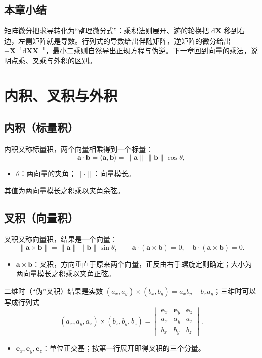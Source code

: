 \documentclass[a4paper]{article}
\begin{document}
\subsection{本章小结}

矩阵微分把求导转化为“整理微分式”：乘积法则展开、迹的轮换把 $\mathrm d\boldsymbol X$ 移到右边，左侧矩阵就是导数。行列式的导数给出伴随矩阵，逆矩阵的微分给出 $-\boldsymbol X^{-1}\mathrm d\boldsymbol X\boldsymbol X^{-1}$，最小二乘则自然导出正规方程与伪逆。下一章回到向量的乘法，说明点乘、叉乘与外积的区别。

\section{内积、叉积与外积}

\subsection{内积（标量积）}

内积又称标量积，两个向量相乘得到一个标量：
\[
\boldsymbol a\cdot\boldsymbol b=\langle\boldsymbol a,\boldsymbol b\rangle=\|\boldsymbol a\|\,\|\boldsymbol b\|\cos\theta ,
\]
\begin{itemize}
\item $\theta$：两向量的夹角；$\|\cdot\|$：向量模长。
\end{itemize}
其值为两向量模长之积乘以夹角余弦。

\subsection{叉积（向量积）}

叉积又称向量积，结果是一个向量：
\[
\|\boldsymbol a\times\boldsymbol b\|=\|\boldsymbol a\|\,\|\boldsymbol b\|\sin\theta,\qquad \boldsymbol a\cdot(\boldsymbol a\times\boldsymbol b)=0,\quad \boldsymbol b\cdot(\boldsymbol a\times\boldsymbol b)=0 .
\]
\begin{itemize}
\item $\boldsymbol a\times\boldsymbol b$：叉积，方向垂直于原来两个向量，正反由右手螺旋定则确定；大小为两向量模长之积乘以夹角正弦。
\end{itemize}
二维时（“伪”叉积）结果是实数 $(a_x,a_y)\times(b_x,b_y)=a_xb_y-b_xa_y$；三维时可以写成行列式
\[
(a_x,a_y,a_z)\times(b_x,b_y,b_z)=\begin{vmatrix}\boldsymbol e_x&\boldsymbol e_y&\boldsymbol e_z\\a_x&a_y&a_z\\b_x&b_y&b_z\end{vmatrix}.
\]
\begin{itemize}
\item $\boldsymbol e_x,\boldsymbol e_y,\boldsymbol e_z$：单位正交基；按第一行展开即得叉积的三个分量。
\end{itemize}
\end{document}
